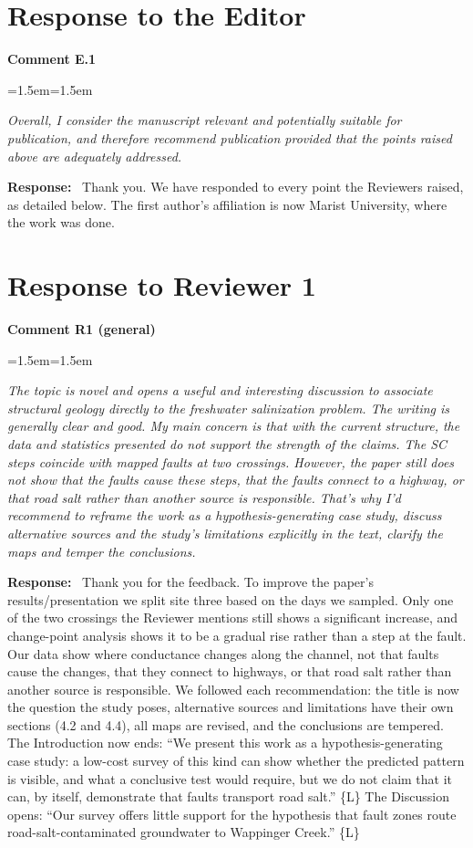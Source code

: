 \documentclass[11pt]{article}
\newcommand{\reviewer}[1]{\section*{Response to Reviewer #1}}
\newcommand{\editor}{\section*{Response to the Editor}}
\newenvironment{comment}[1]
  {\par\medskip\noindent\textbf{Comment #1}\par
   \begin{list}{}{\leftmargin=1.5em\rightmargin=1.5em}\item\color{commentcolor}\itshape}
  {\end{list}}
\newenvironment{response}
  {\par\noindent\textbf{Response:}\ }
  {\par}
\newcommand{\Ln}[1]{\{L\Lref{L:#1}\}}
\newcommand{\mq}[1]{``#1''}
\begin{document}
\editor

\begin{comment}{E.1}
Overall, I consider the manuscript relevant and potentially suitable for publication, and
therefore recommend publication provided that the points raised above are adequately
addressed.
\end{comment}
\begin{response}
Thank you. We have responded to every point the Reviewers raised, as detailed below. The first
author's affiliation is now Marist University, where the work was done.
\end{response}

\reviewer{1}

\begin{comment}{R1 (general)}
The topic is novel and opens a useful and interesting discussion to associate structural
geology directly to the freshwater salinization problem. The writing is generally clear
and good. My main concern is that with the current structure, the data and statistics
presented do not support the strength of the claims. The SC steps coincide with mapped
faults at two crossings. However, the paper still does not show that the faults cause
these steps, that the faults connect to a highway, or that road salt rather than another
source is responsible. That's why I'd recommend to reframe the work as a
hypothesis-generating case study, discuss alternative sources and the study's limitations
explicitly in the text, clarify the maps and temper the conclusions.
\end{comment}
\begin{response}
Thank you for the feedback. To improve the paper's results/presentation we split site three based on the days we sampled. Only one of
the two crossings the Reviewer mentions still shows a significant increase, and change-point
analysis shows it to be a gradual rise rather than a step at the fault. Our data show where conductance changes along the channel, not that faults
cause the changes, that they connect to highways, or that road salt rather than another source
is responsible. We followed each recommendation: the title is now the question the study poses,
alternative sources and limitations have their own sections (4.2 and 4.4), all maps are revised,
and the conclusions are tempered. The Introduction now ends: \mq{We present this work as a hypothesis-generating case study: a low-cost survey of this kind can
show whether the predicted pattern is visible, and what a conclusive test
would require, but we do not claim that it can, by itself, demonstrate that faults transport road salt.}
\Ln{intro-framing} The Discussion opens: \mq{Our survey offers little support for the hypothesis that fault zones route road-salt-contaminated groundwater to Wappinger Creek.} \Ln{disc-answer}
\end{response}
\end{document}

